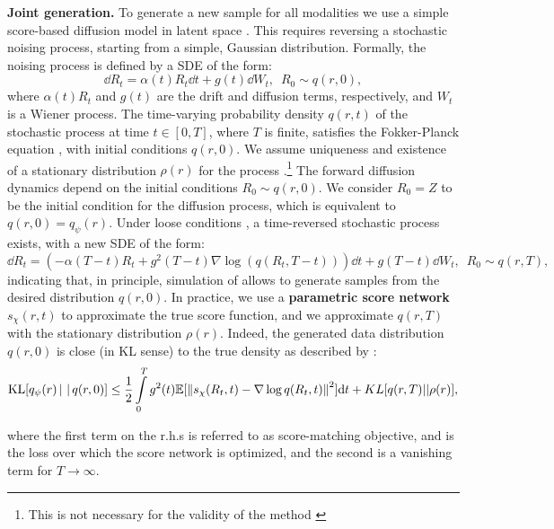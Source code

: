 \noindent \textbf{Joint generation.} To generate a new sample for all modalities we use a simple score-based diffusion model in latent space \citep{diff,Song2020,Vahdat2021,loaizadiagnosing,tran2021model}. This requires reversing a stochastic noising process, starting from a simple, Gaussian distribution. %
Formally, the noising process is defined by a \gls{SDE} of the form:
\begin{equation}\label{eq:fw_sde_j}
    \dd R_t=\alpha(t)R_t\dd t+g(t)\dd W_t,\,\,\, R_0\sim q(r,0),
\end{equation}
where $\alpha(t)R_t$ and $g(t)$ are the drift and diffusion terms, respectively, and $W_t$ is a Wiener process. 
The time-varying probability density $q(r,t)$ of the stochastic process at time $t\in[0,T]$, where $T$ is finite, satisfies the Fokker-Planck equation \citep{oksendal2013stochastic}, with initial conditions $q(r,0)$. We assume uniqueness and existence of a stationary distribution $\rho(r)$ for the process .\footnote{This is not necessary for the validity of the method \cite{song2021maximum}} 
The forward diffusion dynamics depend on the initial conditions $R_0\sim q(r,0)$. We consider $R_0=Z$ to be the initial condition for the diffusion process, which is equivalent to $q(r,0)=q_\psi(r)$. Under loose conditions \citep{anderson1982reverse}, a time-reversed stochastic process exists, with a new \gls{SDE} of the form:
\begin{equation}\label{eq:bw_sde_j}
  \dd R_t=\left(-\alpha(T-t)R_t+g^2(T-t)\nabla\log(q(R_t,T-t))\right)\dd t+g(T-t)\dd W_t, \,\,\, R_0\sim q(r,T),  
\end{equation}
indicating that, in principle, simulation of  allows to generate samples from the desired distribution $q(r,0)$. In practice, we use a \textbf{parametric score network} $s_\chi(r,t)$ to approximate the true score function, and we approximate $q(r,T)$ with the stationary distribution $\rho(r)$. Indeed, the generated data distribution $q(r,0)$ is close (in KL sense) to the true density as described by \cite{song2021maximum, howmuch}: 
\begin{equation}\label{elbo_diff_j}
\mathrm{KL}[q_\psi(r)\,|\,\,|\, q(r,0)]\leq \frac{1}{2}\int\limits_0^T g^2(t)\mathbb{E}[\norm{s_\chi(R_t,t)-\nabla\log q(R_t,t)}^2]\dd t+KL[q(r,T)||\rho(r)],     
\end{equation}



where the first term on the r.h.s is referred to as score-matching objective, and is the loss over which the score network is optimized, and the second is a vanishing term for $T\rightarrow\infty$. 


